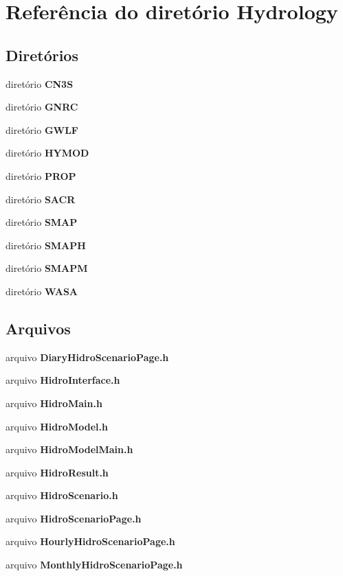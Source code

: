 \section{Referência do diretório Hydrology}
\label{dir_35cadfbabc0efc2b934cfb93db6b06e7}
\subsection*{Diretórios}
\begin{DoxyCompactItemize}
\item 
diretório {\bf C\+N3S}
\item 
diretório {\bf G\+N\+RC}
\item 
diretório {\bf G\+W\+LF}
\item 
diretório {\bf H\+Y\+M\+OD}
\item 
diretório {\bf P\+R\+OP}
\item 
diretório {\bf S\+A\+CR}
\item 
diretório {\bf S\+M\+AP}
\item 
diretório {\bf S\+M\+A\+PH}
\item 
diretório {\bf S\+M\+A\+PM}
\item 
diretório {\bf W\+A\+SA}
\end{DoxyCompactItemize}
\subsection*{Arquivos}
\begin{DoxyCompactItemize}
\item 
arquivo {\bf Diary\+Hidro\+Scenario\+Page.\+h}
\item 
arquivo {\bf Hidro\+Interface.\+h}
\item 
arquivo {\bf Hidro\+Main.\+h}
\item 
arquivo {\bf Hidro\+Model.\+h}
\item 
arquivo {\bf Hidro\+Model\+Main.\+h}
\item 
arquivo {\bf Hidro\+Result.\+h}
\item 
arquivo {\bf Hidro\+Scenario.\+h}
\item 
arquivo {\bf Hidro\+Scenario\+Page.\+h}
\item 
arquivo {\bf Hourly\+Hidro\+Scenario\+Page.\+h}
\item 
arquivo {\bf Monthly\+Hidro\+Scenario\+Page.\+h}
\end{DoxyCompactItemize}
